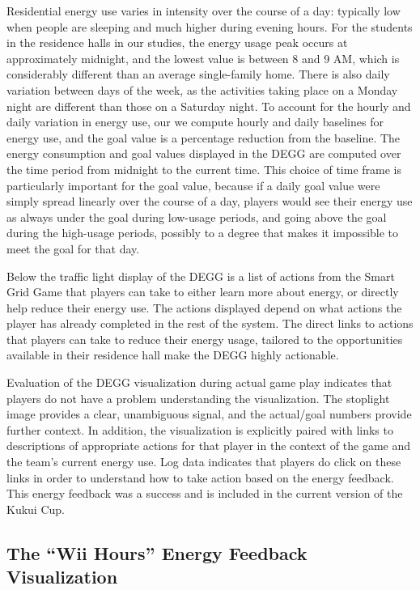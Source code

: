 \documentclass[10pt, conference, compsocconf]{IEEEtran}
\begin{document}
Residential energy use varies in intensity over the course of a day: typically low when people are sleeping and much higher during evening hours. For the students in the residence halls in our studies, the energy usage peak occurs at approximately midnight, and the lowest value is between 8 and 9 AM, which is considerably different than an average single-family home. There is also daily variation between days of the week, as the activities taking place on a Monday night are different than those on a Saturday night. To account for the hourly and daily variation in energy use, our we compute hourly and daily baselines for energy use, and the goal value is a percentage reduction from the baseline. The energy consumption and goal values displayed in the DEGG are computed over the time period from midnight to the current time. This choice of time frame is particularly important for the goal value, because if a daily goal value were simply spread linearly over the course of a day, players would see their energy use as always under the goal during low-usage periods, and going above the goal during the high-usage periods, possibly to a degree that makes it impossible to meet the goal for that day.

Below the traffic light display of the DEGG is a list of actions from the Smart Grid Game that players can take to either learn more about energy, or directly help reduce their energy use. The actions displayed depend on what actions the player has already completed in the rest of the system. The direct links to actions that players can take to reduce their energy usage, tailored to the opportunities available in their residence hall make the DEGG highly actionable.

Evaluation of the DEGG visualization during actual game play indicates that players do not have a problem understanding the visualization. The stoplight image provides a clear, unambiguous signal, and the actual/goal numbers provide further context. In addition, the visualization is explicitly paired with links to descriptions of appropriate actions for that player in the context of the game and the team's current energy use. Log data indicates that players do click on these links in order to understand how to take action based on the energy feedback. This energy feedback was a success and is included in the current version of the Kukui Cup.

\subsection{The ``Wii Hours'' Energy Feedback Visualization}
\end{document}

